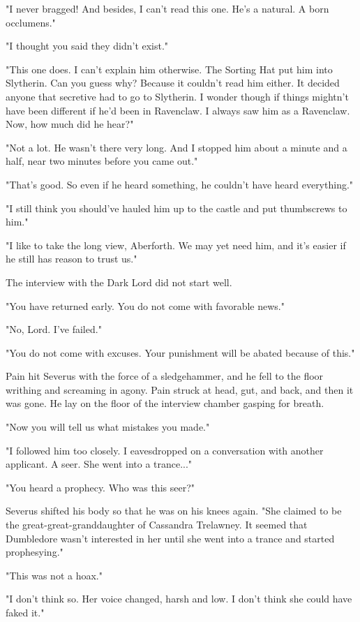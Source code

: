 "I never bragged! And besides, I can't read this one. He's a natural. A born occlumens."

"I thought you said they didn't exist."

"This one does. I can't explain him otherwise. The Sorting Hat put him into Slytherin. Can you guess why? Because it couldn't read him either. It decided anyone that secretive had to go to Slytherin. I wonder though if things mightn't have been different if he'd been in Ravenclaw. I always saw him as a Ravenclaw. Now, how much did he hear?"

"Not a lot. He wasn't there very long. And I stopped him about a minute and a half, near two minutes before you came out."

"That's good. So even if he heard something, he couldn't have heard everything."

"I still think you should've hauled him up to the castle and put thumbscrews to him."

"I like to take the long view, Aberforth. We may yet need him, and it's easier if he still has reason to trust us."

The interview with the Dark Lord did not start well.

"You have returned early. You do not come with favorable news."

"No, Lord. I've failed."

"You do not come with excuses. Your punishment will be abated because of this."

Pain hit Severus with the force of a sledgehammer, and he fell to the floor writhing and screaming in agony. Pain struck at head, gut, and back, and then it was gone. He lay on the floor of the interview chamber gasping for breath.

"Now you will tell us what mistakes you made."

"I followed him too closely. I eavesdropped on a conversation with another applicant. A seer. She went into a trance..."

"You heard a prophecy. Who was this seer?"

Severus shifted his body so that he was on his knees again. "She claimed to be the great-great-granddaughter of Cassandra Trelawney. It seemed that Dumbledore wasn't interested in her until she went into a trance and started prophesying."

"This was not a hoax."

"I don't think so. Her voice changed, harsh and low. I don't think she could have faked it."

